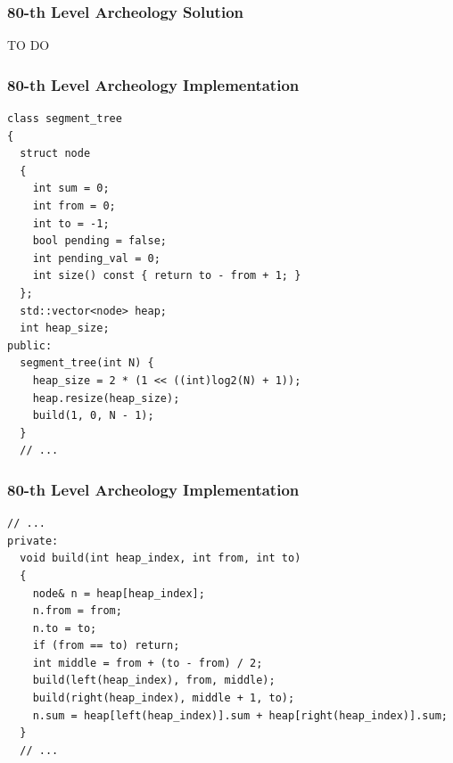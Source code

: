 \documentclass{beamer}
\newcommand{\uvalink}[2]{UVa Online Judge (http://uva.onlinejudge.org)
  problem number \href{#2}{\textcolor{blue}{#1}.}}
\newcommand{\codeforceslink}[2]{CodeForces (http://www.codeforces.com)
  problem: \href{#2}{\textcolor{blue}{#1}.}}
\newcounter{exo}
\newcommand{\exo}{
  \addtocounter{exo}{1}
  Exercice \arabic{exo}
}
\begin{document}
\fi





\ifanswers

\begin{frame}[containsverbatim]
\frametitle{80-th Level Archeology Solution}

TO DO

\end{frame}


\begin{frame}[containsverbatim]
\frametitle{80-th Level Archeology Implementation}

\scriptsize

\begin{lstlisting}[mathescape]
class segment_tree
{
  struct node
  {
    int sum = 0;
    int from = 0;
    int to = -1;
    bool pending = false;
    int pending_val = 0;
    int size() const { return to - from + 1; }
  };
  std::vector<node> heap;
  int heap_size;
public:
  segment_tree(int N) {
    heap_size = 2 * (1 << ((int)log2(N) + 1));
    heap.resize(heap_size);
    build(1, 0, N - 1);
  }
  // ...
\end{lstlisting}

\end{frame}

\begin{frame}[containsverbatim]
\frametitle{80-th Level Archeology Implementation}

\scriptsize

\begin{lstlisting}[mathescape]
  // ...
private:
  void build(int heap_index, int from, int to)
  {
    node& n = heap[heap_index];
    n.from = from;
    n.to = to;
    if (from == to) return;
    int middle = from + (to - from) / 2;
    build(left(heap_index), from, middle);
    build(right(heap_index), middle + 1, to);
    n.sum = heap[left(heap_index)].sum + heap[right(heap_index)].sum;
  }
  // ...
\end{lstlisting}

\end{frame}
\end{document}

